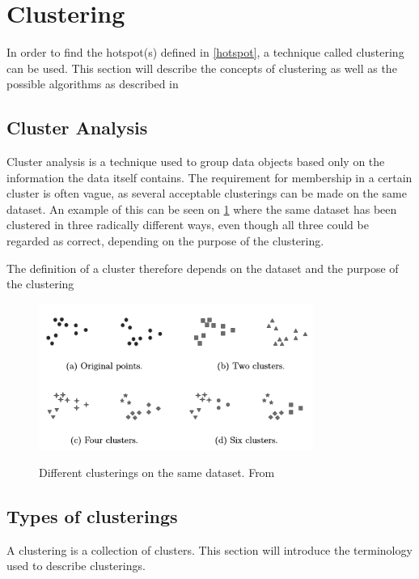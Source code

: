 \section{Clustering}\label{clustering}
In order to find the hotspot(s) defined in \cref{hotspot}, a technique called clustering can be used.
This section will describe the concepts of clustering as well as the possible algorithms as described in \citet{pang2006introduction} 

\subsection{Cluster Analysis}
Cluster analysis is a technique used to group data objects based only on the information the data itself contains.
The requirement for membership in a certain cluster is often vague, as several acceptable clusterings can be made on the same dataset.
An example of this can be seen on \cref{clusterings} where the same dataset has been clustered in three radically different ways, even though all three could be regarded as correct, depending on the purpose of the clustering.

The definition of a cluster therefore depends on the dataset and the purpose of the clustering 

\begin{figure}[H]
\includegraphics[width=0.8\textwidth]{graphics/clusterings}
\centering
\label{clusterings}
\caption{Different clusterings on the same dataset. From \citet{pang2006introduction}}
\end{figure}

\subsection{Types of clusterings}

A clustering is a collection of clusters.
This section will introduce the terminology used to describe clusterings. 

